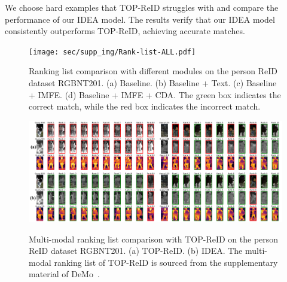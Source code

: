%
We choose hard examples that TOP-ReID struggles with and compare the performance of our IDEA model.
%
The results verify that our IDEA model consistently outperforms TOP-ReID, achieving accurate matches.
%
\begin{figure}[t]
  \centering
    \resizebox{0.96\textwidth}{!}
    {
  \texttt{[image: sec/supp\_img/Rank-list-ALL.pdf]}
  }
  \vspace{-2mm}
   \caption{Ranking list comparison with different modules on the person ReID dataset RGBNT201.
   (a) Baseline.
   (b) Baseline + Text.
   (c) Baseline + IMFE.
   (d) Baseline + IMFE + CDA.
   The green box indicates the correct match, while the red box indicates the incorrect match.}
  \label{fig:rank_overall}
  \vspace{-2mm}
\end{figure}
\begin{figure}[t]
  \centering
    \resizebox{0.96\textwidth}{!}
    {
  \includegraphics[width=30.\linewidth]{sec/supp_img/Rank-list-TOPReID.pdf}
  }
  \vspace{-2mm}
   \caption{Multi-modal ranking list comparison with TOP-ReID on the person ReID dataset RGBNT201.
   (a) TOP-ReID.
    (b) IDEA.
    The multi-modal ranking list of TOP-ReID is sourced from the supplementary material of DeMo~\cite{wang2024decoupled}.}
  \label{fig:rank_TOP}
  \vspace{-2mm}
\end{figure}
